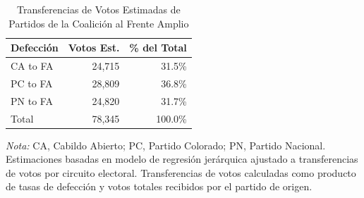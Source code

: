 \begin{table}[H]
\centering
\caption{Transferencias de Votos Estimadas de Partidos de la Coalición al Frente Amplio}
\label{tab:vote_impact}
\begin{tabular}{lrr}
\toprule
\textbf{Defección} & \textbf{Votos Est.} & \textbf{\% del Total} \\
\midrule
CA to FA & 24,715 & 31.5\% \\
PC to FA & 28,809 & 36.8\% \\
PN to FA & 24,820 & 31.7\% \\
\midrule
Total & 78,345 & 100.0\% \\
\bottomrule
\end{tabular}
\begin{flushleft}
\footnotesize \textit{Nota:} CA, Cabildo Abierto; PC, Partido Colorado; PN, Partido Nacional. Estimaciones basadas en modelo de regresión jerárquica ajustado a transferencias de votos por circuito electoral. Transferencias de votos calculadas como producto de tasas de defección y votos totales recibidos por el partido de origen.
\end{flushleft}
\end{table}

